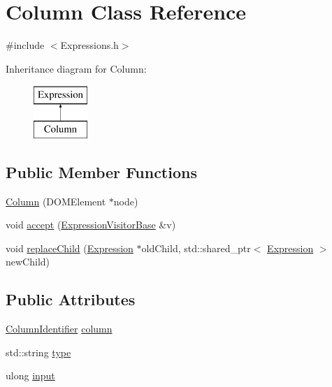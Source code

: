 \hypertarget{class_column}{\section{Column Class Reference}
\label{class_column}
}


{\ttfamily \#include $<$Expressions.\+h$>$}

Inheritance diagram for Column\+:\begin{figure}[H]
\begin{center}
\leavevmode
\includegraphics[height=2.000000cm]{class_column}
\end{center}
\end{figure}
\subsection*{Public Member Functions}
\begin{DoxyCompactItemize}
\item 
\hyperlink{class_column_a9934481a60fd2373bfe7ced5f208b505}{Column} (D\+O\+M\+Element $\ast$node)
\item 
void \hyperlink{class_column_a6e925985b1e87ed92795d318c52e5470}{accept} (\hyperlink{class_expression_visitor_base}{Expression\+Visitor\+Base} \&v)
\item 
void \hyperlink{class_column_af1571fb51f887aeb1dcf7ff44382a72b}{replace\+Child} (\hyperlink{class_expression}{Expression} $\ast$old\+Child, std\+::shared\+\_\+ptr$<$ \hyperlink{class_expression}{Expression} $>$ new\+Child)
\end{DoxyCompactItemize}
\subsection*{Public Attributes}
\begin{DoxyCompactItemize}
\item 
\hyperlink{class_column_identifier}{Column\+Identifier} \hyperlink{class_column_a22e87a2e1f67da45c085a9898156e31c}{column}
\item 
std\+::string \hyperlink{class_column_a18cd6b6f12a338f6e08c36da7fadb7ec}{type}
\item 
ulong \hyperlink{class_column_addd3816c69df05b9f717348dca79ee21}{input}
\end{DoxyCompactItemize}
